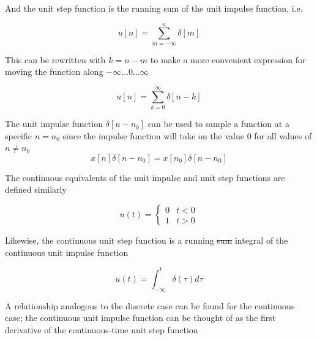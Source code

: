 \documentclass[10pt]{article}
\begin{document}
And the unit step function is the running sum of the unit impulse function, i.e.

\begin{equation}
	u[n] = \sum_{m=-\infty}^n \delta[m]
\end{equation}

This can be rewritten with $ k = n-m $ to make a more convenient expression for moving the function along $ -\infty\ldots0\ldots\infty $ 

\begin{equation}
	u[n] = \sum_{k=0}^\infty \delta[n-k]
\end{equation}




\begin{theorem}
	
The unit impulse function $ \delta[n-n_0] $ can be used to sample a function at a specific $ n = n_0 $ since the impulse function will take on the value $ 0 $ for all values of $ n \neq  n_0$ 
\begin{equation}
	x[n] \delta[n-n_0] = x[n_0]\delta[n-n_0]
\end{equation}
\end{theorem}





The continuous equivalents of the unit impulse and unit step functions are defined similarly

\begin{definition}
	
\begin{equation}
	u(t) = \begin{cases}
		0 & t < 0 \\
		1 & t > 0
	\end{cases}
\end{equation}
\end{definition}


Likewise, the continuous unit step function is a running \st{sum} integral of the continuous unit impulse function

\begin{equation}
	u(t) = \int^{t}_{-\infty} \delta(\tau)d\tau
	\label{eq:355:unit_step_cont}
\end{equation}


A relationship analogous to the discrete case can be found for the continuous case; the continuous unit impulse function can be thought of as the first derivative of the continuous-time unit step function
\end{document}
